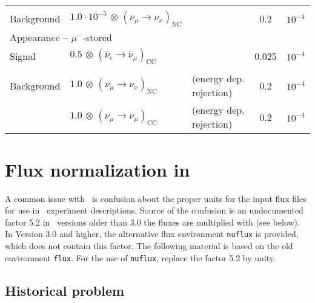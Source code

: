 \begin{appendix}
\begin{center}
\begin{tabular}{|l|ll|c|c|}
 & & & & \\
Background &  $1.0\cdot 10^{-5} \, \otimes \, (\nu_\mu \rightarrow \nu_x)_\mathrm{NC}$ & & 0.2& $10^{-4}$\\ \hline \hline
\multicolumn{3}{|l|}{Appearance -- $\mu^-$-stored} & & \\ \hline
Signal & $0.5 \, \otimes \, (\bar{\nu}_e \rightarrow \bar{\nu}_\mu)_\mathrm{CC}$  & & 0.025& $10^{-4}$\\
 & & & & \\
Background &  $1.0 \, \otimes \, (\nu_\mu \rightarrow \nu_x)_\mathrm{NC}$ & (energy dep. rejection)
& 0.2 & $10^{-4}$\\
 & $1.0 \, \otimes \, (\nu_\mu \rightarrow
\nu_\mu)_\mathrm{CC}$  & (energy dep. rejection)
&0.2& $10^{-4}$\\ \hline \hline
\end{tabular}
\end{center}









\chapter{Flux normalization in \GLOBES }
\label{app:flux}

A common issue with \GLOBES\ is confusion about the proper units for
the input flux files for use in \AEDL\ experiment descriptions. Source of
the confusion is an undocumented factor 5.2 in \GLOBES\ versions older
than 3.0 the fluxes are multiplied with (see below). In Version 3.0 and 
higher, the alternative flux environment {\tt nuflux} is provided, 
which does not contain this factor. The following material is
based on the old environment {\tt flux}. For the use of {\tt nuflux},
replace the factor 5.2 by unity.

\section*{Historical problem}


\end{appendix}
